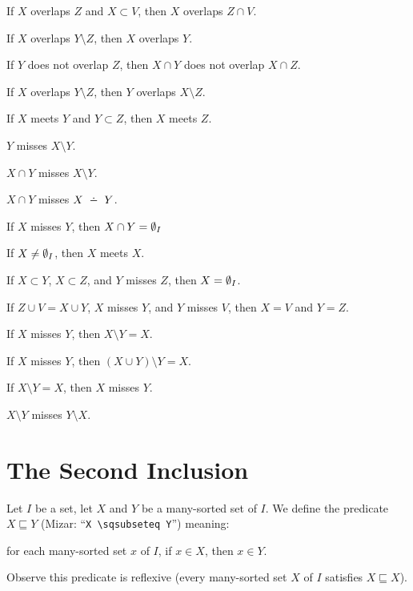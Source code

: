 \documentclass{article}
\begin{document}
\begin{thm}
\item\label{pboole:103} If $X$ overlaps $Z$ and $X\subset V$, then $X$
  overlaps $Z\cap V$.
\item\label{pboole:104} If $X$ overlaps $Y\setminus Z$, then $X$
  overlaps $Y$.
\item\label{pboole:105} If $Y$ does not overlap $Z$, then $X\cap Y$ does
  not overlap $X\cap Z$.
\item\label{pboole:106} If $X$ overlaps $Y\setminus Z$, then $Y$
  overlaps $X\setminus Z$.
\item\label{pboole:107} If $X$ meets $Y$ and $Y\subset Z$, then $X$
  meets $Z$.
\item\label{pboole:108} $Y$ misses $X\setminus Y$.
\item\label{pboole:109} $X\cap Y$ misses $X\setminus Y$.
\item\label{pboole:110} $X\cap Y$ misses $X\symdiff Y$.
\item\label{pboole:111} If $X$ misses $Y$, then $X\cap Y=\emptyset_{I}$
\item\label{pboole:112} If $X\neq\emptyset_{I}$, then $X$ meets $X$.
\item\label{pboole:113} If $X\subset Y$, $X\subset Z$, and $Y$ misses $Z$,
  then $X=\emptyset_{I}$.
\item\label{pboole:114} If $Z\cup V=X\cup Y$, $X$ misses $Y$, and $Y$
  misses $V$, then $X=V$ and $Y=Z$.
\item\label{pboole:115} If $X$ misses $Y$, then $X\setminus Y=X$.
\item\label{pboole:116} If $X$ misses $Y$, then $(X\cup Y)\setminus Y=X$.
\item\label{pboole:117} If $X\setminus Y=X$, then $X$ misses $Y$.
\item\label{pboole:118} $X\setminus Y$ misses $Y\setminus X$.
\end{thm}

\section{The Second Inclusion}

\begin{definition}
Let $I$ be a set, let $X$ and $Y$ be a many-sorted set of $I$.
We define the predicate $X \sqsubseteq  Y$ (Mizar: ``\verb#X \sqsubseteq Y#'')
meaning:
\begin{defn}
\item for each many-sorted set $x$ of $I$, if $x\in X$, then $x\in Y$.
\end{defn}
Observe this predicate is reflexive (every many-sorted set $X$ of $I$
satisfies $X \sqsubseteq X$).
\end{definition}
\end{document}
